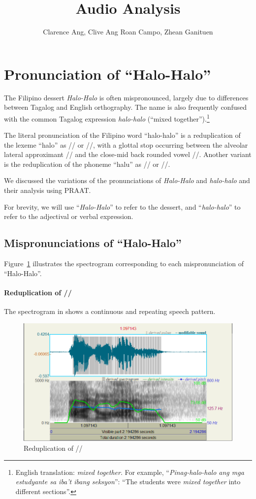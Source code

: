 \documentclass{article}
\title{Audio Analysis}
\author{   
    Clarence Ang,
    Clive Ang
    Roan Campo,
    Zhean Ganituen
}
\begin{document}
\maketitle

\section{Pronunciation of ``Halo-Halo''}

The Filipino dessert \emph{Halo-Halo} is often mispronounced, largely due to
differences between Tagalog and English orthography. The name is also
frequently confused with the common Tagalog expression \emph{halo-halo}
(``mixed together'').\footnote{English translation: \emph{mixed together}. For
    example, ``\emph{Pinag-halo-halo ang mga estudyante sa iba't ibang seksyon}'':
    ``The students were \emph{mixed together} into different sections''.}

The literal pronunciation of the Filipino word ``halo-halo'' is a reduplication
of the lexeme ``halo'' as // or //, with a glottal
stop occurring between the alveolar lateral approximant // and the
close-mid back rounded vowel //. Another variant is the
reduplication of the phoneme ``halu'' as // or //.

We discussed the variations of the pronunciations of \emph{Halo-Halo} and
\emph{halo-halo} and their analysis using PRAAT.

For brevity, we will use ``\emph{Halo-Halo}'' to refer to the dessert, and
``\emph{halo-halo}'' to refer to the adjectival or verbal expression.

\subsection{Mispronunciations of ``Halo-Halo''}

Figure~\ref{fig:halo} illustrates the spectrogram corresponding to each
mispronunciation of ``Halo-Halo''.

\paragraph{Reduplication of //} The spectrogram in
 shows a continuous and repeating speech pattern.

\begin{figure}
    \centering
    \includegraphics[width=0.65\linewidth]{img/halo.png}
    \caption{Reduplication of //}\label{fig:halo}
\end{figure}
\end{document}
